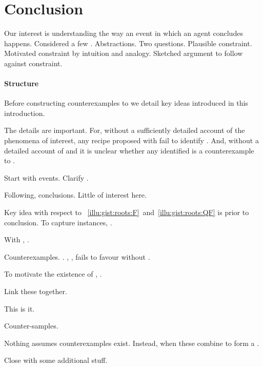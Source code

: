 \section*{Conclusion}
\label{sec:conclusion}

\begin{note}
  Our interest is understanding the way an event in which an agent concludes happens.
  Considered a few .
  Abstractions.
  Two questions.
  Plausible constraint.
  Motivated constraint by intuition and analogy.
  Sketched argument to follow against constraint.
\end{note}


\newpage

\paragraph*{Structure}


\begin{note}
  Before constructing counterexamples to \issueInclusion{} we detail key ideas introduced in this introduction.

  The details are important.
  For, without a sufficiently detailed account of the phenomena of interest, any recipe proposed with fail to identify .
  And, without a detailed account of \qWhy{} and \qHow{} it is unclear whether any identified  is a counterexample to \issueInclusion{}.

  Start with events.
  Clarify \qWhy{}.

  Following, conclusions.
  Little of interest here.

  Key idea with respect to ~\ref{illu:gist:roots:F}~and~\ref{illu:gist:roots:QF} is \ros{} prior to conclusion.
  To capture instances, .

  With , .

  Counterexamples.
  .
  , , fails to favour without .

  To motivate the existence of , \tC{}.

  Link these together.

  This is it.

  Counter-samples.

  Nothing assumes counterexamples exist.
  Instead, when these combine to form a \scen{}.

  Close with some additional stuff.
\end{note}




